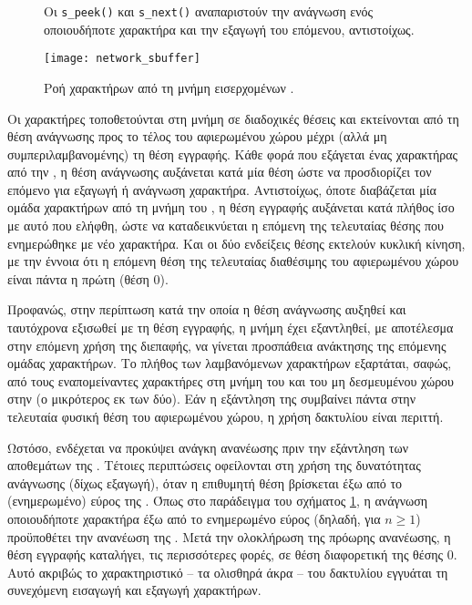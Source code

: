 \begin{figure}
    \caption{Ροή χαρακτήρων από τη μνήμη εισερχομένων .
    \label{fig:network:sbuffer}}

    Οι \verb~s_peek()~ και \verb~s_next()~ αναπαριστούν την ανάγνωση ενός
    οποιουδήποτε χαρακτήρα και την εξαγωγή του επόμενου, αντιστοίχως.
    \begin{center}
    \texttt{[image: network\_sbuffer]}
    \end{center}
\end{figure}

Οι χαρακτήρες τοποθετούνται στη μνήμη  σε διαδοχικές θέσεις και
εκτείνονται από τη θέση ανάγνωσης προς το τέλος του αφιερωμένου χώρου μέχρι
(αλλά μη συμπεριλαμβανομένης) τη θέση εγγραφής. Κάθε φορά που εξάγεται ένας
χαρακτήρας από την , η θέση ανάγνωσης αυξάνεται κατά μία θέση ώστε να
προσδιορίζει τον επόμενο για εξαγωγή ή ανάγνωση χαρακτήρα. Αντιστοίχως, όποτε
διαβάζεται μία ομάδα χαρακτήρων από τη μνήμη του , η θέση εγγραφής
αυξάνεται κατά πλήθος ίσο με αυτό που ελήφθη, ώστε να καταδεικνύεται η επόμενη
της τελευταίας θέσης που ενημερώθηκε με νέο χαρακτήρα. Και οι δύο ενδείξεις
θέσης εκτελούν κυκλική κίνηση, με την έννοια ότι η επόμενη θέση της τελευταίας
διαθέσιμης του αφιερωμένου χώρου είναι πάντα η πρώτη (θέση 0).

Προφανώς, στην περίπτωση κατά την οποία η θέση ανάγνωσης αυξηθεί και ταυτόχρονα
εξισωθεί με τη θέση εγγραφής, η μνήμη  έχει εξαντληθεί,
με αποτέλεσμα στην επόμενη χρήση της διεπαφής, να γίνεται προσπάθεια ανάκτησης
της επόμενης ομάδας χαρακτήρων. Το πλήθος των λαμβανόμενων χαρακτήρων εξαρτάται,
σαφώς, από τους εναπομείναντες χαρακτήρες στη μνήμη του  και του μη
δεσμευμένου χώρου στην  (ο μικρότερος εκ των δύο). Εάν η εξάντληση της
 συμβαίνει πάντα στην τελευταία φυσική θέση του αφιερωμένου χώρου, η
χρήση δακτυλίου είναι περιττή.

Ωστόσο, ενδέχεται να προκύψει ανάγκη ανανέωσης πριν την εξάντληση των αποθεμάτων
της . Τέτοιες περιπτώσεις οφείλονται στη χρήση της δυνατότητας
ανάγνωσης (δίχως εξαγωγή), όταν η επιθυμητή θέση βρίσκεται έξω από το
(ενημερωμένο) εύρος της . Όπως στο παράδειγμα του σχήματος
\ref{fig:network:sbuffer}, η ανάγνωση οποιουδήποτε χαρακτήρα έξω από το
ενημερωμένο εύρος (δηλαδή, για $n \ge 1$) προϋποθέτει την ανανέωση της
. Μετά την ολοκλήρωση της πρόωρης ανανέωσης, η θέση εγγραφής
καταλήγει, τις περισσότερες φορές, σε θέση διαφορετική της θέσης 0.
Αυτό ακριβώς το χαρακτηριστικό -- τα ολισθηρά άκρα -- του δακτυλίου εγγυάται τη
συνεχόμενη εισαγωγή και εξαγωγή χαρακτήρων.

